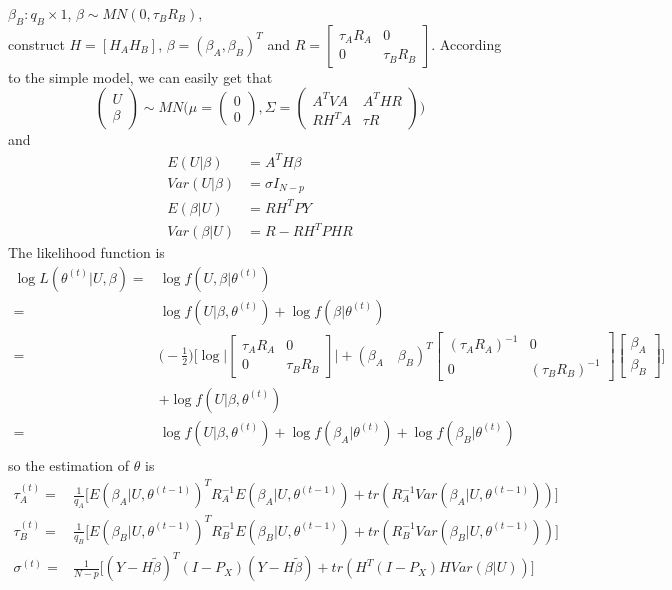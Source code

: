 \documentclass[12pt]{article}
\begin{document}
    $\beta_B:q_B\times 1$, $\beta\sim MN(0,\tau_B R_B)$, \\
    construct $H=[H_A H_B]$, $\beta=(\beta_A, \beta_B)^T$ and $R=\begin{bmatrix}\tau_A R_A&0\\0&\tau_B R_B \end{bmatrix} $.
    According to the simple model, we can easily get that
    \begin{equation*}
    \begin{pmatrix}
    U\\
    \beta
    \end{pmatrix}
    \sim MN\Big( \mu=\begin{pmatrix}
    0\\
    0
    \end{pmatrix}
    ,\Sigma=\begin{pmatrix}
    A^TVA& A^THR\\
    RH^TA&\tau R
    \end{pmatrix}
    \Big)
    \end{equation*}
    and
    \begin{align*}
        E(U|\beta)&=A^TH\beta\\
        Var(U|\beta)&=\sigma I_{N-p}\\
        E(\beta|U)&=RH^TPY\\
        Var(\beta|U)&= R-RH^TPHR
    \end{align*}
    The likelihood function is
    \begin{align*}
        \log L(\theta^{(t)}|U,\beta)=&\log f(U,\beta|\theta^{(t)})\\
        =&\log f(U|\beta,\theta^{(t)})+ \log f(\beta|\theta^{(t)})\\
        =&\Big(-\frac{1}{2} \Big)\Big[\log\Big|\begin{bmatrix} \tau_AR_A&0\\0&\tau_BR_B \end{bmatrix} \Big|+(\beta_A\quad\beta_B)^T
        \begin{bmatrix}(\tau_AR_A)^{-1}&0\\0&(\tau_BR_B)^{-1}\end{bmatrix}\begin{bmatrix}\beta_A\\ \beta_B\end{bmatrix}           \Big]\\
        &+\log f(U|\beta,\theta^{(t)})\\
        =&\log f(U|\beta,\theta^{(t)})+ \log f(\beta_A|\theta^{(t)})+ \log f(\beta_B|\theta^{(t)})\\
    \end{align*}
    so the estimation of $\theta$ is
    \begin{align}
    \tau^{(t)}_A=&\frac{1}{q_A}\Big[E(\beta_A|U,\theta^{(t-1)})^TR_A^{-1} E(\beta_A|U,\theta^{(t-1)})+tr(R_A^{-1} Var(\beta_A|U,\theta^{(t-1)}))\Big]\\
    \tau^{(t)}_B=&\frac{1}{q_B}\Big[E(\beta_B|U,\theta^{(t-1)})^TR_B^{-1} E(\beta_B|U,\theta^{(t-1)})+tr(R_B^{-1} Var(\beta_B|U,\theta^{(t-1)}))\Big]\\
    \sigma^{(t)}=&\frac{1}{N-p}\Big[(Y-H\tilde{\beta})^T(I-P_X)(Y-H\tilde{\beta})+tr(H^T(I-P_X)H Var(\beta|U))         \Big]
    \end{align}
\end{document}
